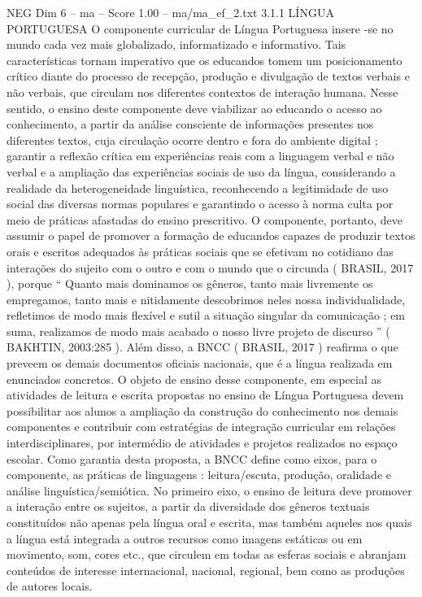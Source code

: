 \begin{textsample}{NEG Dim 6 – ma – Score 1.00 – ma/ma\_ef\_2.txt}  \label{ex:f6_neg_194}
3.1.1 LÍNGUA PORTUGUESA O componente curricular de Língua Portuguesa insere -se no mundo cada vez mais globalizado, informatizado e informativo.
Tais características tornam imperativo que os educandos tomem um posicionamento crítico diante do processo de recepção, produção e divulgação de textos verbais e não verbais, que circulam nos diferentes contextos de interação humana.
Nesse sentido, o ensino deste componente deve viabilizar ao educando o acesso ao conhecimento, a partir da análise consciente de informações presentes nos diferentes textos, cuja circulação ocorre dentro e fora do ambiente digital ; garantir a reflexão crítica em experiências reais com a linguagem verbal e não verbal e a ampliação das experiências sociais de uso da língua, considerando a realidade da heterogeneidade linguística, reconhecendo a legitimidade de uso social das diversas normas populares e garantindo o acesso à norma culta por meio de práticas afastadas do ensino prescritivo.
O componente, portanto, deve assumir o papel de promover a formação de educandos capazes de produzir textos orais e escritos adequados às práticas sociais que se efetivam no cotidiano das interações do sujeito com o outro e com o mundo que o circunda ( BRASIL, 2017 ), porque “ Quanto mais dominamos os gêneros, tanto mais livremente os empregamos, tanto mais e nitidamente descobrimos neles nossa individualidade, refletimos de modo mais flexível e sutil a situação singular da comunicação ; em suma, realizamos de modo mais acabado o nosso livre projeto de discurso ” ( BAKHTIN, 2003:285 ).
Além disso, a BNCC ( BRASIL, 2017 ) reafirma o que preveem os demais documentos oficiais nacionais, que é a língua realizada em enunciados concretos.
O objeto de ensino desse componente, em especial as atividades de leitura e escrita propostas no ensino de Língua Portuguesa devem possibilitar aos alunos a ampliação da construção do conhecimento nos demais componentes e contribuir com estratégias de integração curricular em relações interdisciplinares, por intermédio de atividades e projetos realizados no espaço escolar.
Como garantia desta proposta, a BNCC define como eixos, para o componente, as práticas de linguagens : leitura/escuta, produção, oralidade e análise linguística/semiótica.
No primeiro eixo, o ensino de leitura deve promover a interação entre os sujeitos, a partir da diversidade dos gêneros textuais constituídos não apenas pela língua oral e escrita, mas também aqueles nos quais a língua está integrada a outros recursos como imagens estáticas ou em movimento, som, cores etc., que circulem em todas as esferas sociais e abranjam conteúdos de interesse internacional, nacional, regional, bem como as produções de autores locais.

\end{textsample}
